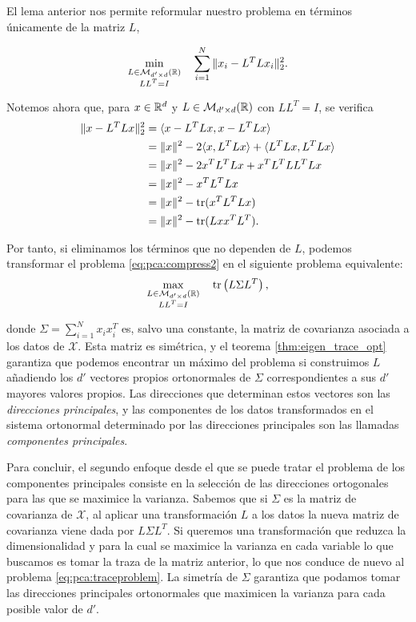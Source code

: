 El lema anterior nos permite reformular nuestro problema en términos únicamente de la matriz $L$,

\begin{equation} \label{eq:pca:compress2}
    \min_{\substack{L \in \mathcal{M}_{d'\times d}(\mathbb{R}) \\LL^T = I}} \quad \sum_{i=1}^{N} \|x_i - L^TLx_i\|_2^2.
\end{equation}

Notemos ahora que, para $x \in \mathbb{R}^d$ y $L \in \mathcal{M}_{d'\times d}(\mathbb{R})$ con $LL^T = I$, se verifica
\begin{align*}
    \|x - L^TLx\|_2^2 &= \langle x - L^TLx, x - L^TLx \rangle \\
                      &= \|x\|^2 - 2\langle x,L^TLx \rangle + \langle L^TLx, L^TLx \rangle \\
                      &= \|x\|^2 - 2x^TL^TLx + x^TL^TLL^TLx \\
                      &= \|x\|^2 - x^TL^TLx \\
                      &= \|x\|^2 - \operatorname{tr}(x^TL^TLx) \\
                      &= \|x\|^2 - \operatorname{tr}(Lxx^TL^T).
\end{align*}

Por tanto, si eliminamos los términos que no dependen de $L$, podemos transformar el problema \ref{eq:pca:compress2} en el siguiente problema equivalente:
\begin{equation} \label{eq:pca:traceproblem}
    \max_{\substack{L \in \mathcal{M}_{d'\times d}(\mathbb{R}) \\LL^T = I}} \quad \operatorname{tr}\left(L \Sigma L^T\right),
\end{equation}

donde $\Sigma = \sum_{i=1}^N x_ix_i^T$ es, salvo una constante, la matriz de covarianza asociada a los datos de $\mathcal{X}$. Esta matriz es simétrica, y el teorema \ref{thm:eigen_trace_opt} garantiza que podemos encontrar un máximo del problema si construimos $L$ añadiendo los $d'$ vectores propios ortonormales de $\Sigma$ correspondientes a sus $d'$ mayores valores propios. Las direcciones que determinan estos vectores son las \emph{direcciones principales}, y las componentes de los datos transformados en el sistema ortonormal determinado por las direcciones principales son las llamadas \emph{componentes principales}.

Para concluir, el segundo enfoque desde el que se puede tratar el problema de los componentes principales consiste en la selección de las direcciones ortogonales para las que se maximice la varianza. Sabemos que si $\Sigma$ es la matriz de covarianza de $\mathcal{X}$, al aplicar una transformación $L$ a los datos la nueva matriz de covarianza viene dada por $L\Sigma L^T$. Si queremos una transformación que reduzca la dimensionalidad y para la cual se maximice la varianza en cada variable lo que buscamos es tomar la traza de la matriz anterior, lo que nos conduce de nuevo al problema \ref{eq:pca:traceproblem}. La simetría de $\Sigma$ garantiza que podamos tomar las direcciones principales ortonormales que maximicen la varianza para cada posible valor de $d'$.

